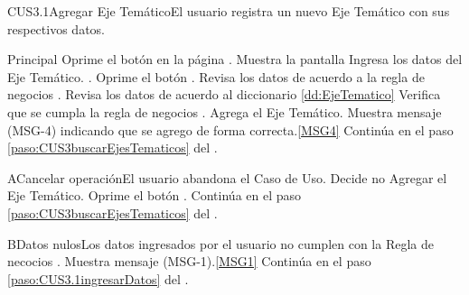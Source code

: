 	\begin{UseCase}{CUS3.1}{Agregar Eje Temático}{El usuario registra un nuevo Eje Temático con sus respectivos datos.}
	\end{UseCase}
	\begin{UCtrayectoria}{Principal}
			\UCpaso[\UCactor] Oprime el botón  en la página .
			\UCpaso Muestra la pantalla  
			\UCpaso [\UCactor] Ingresa los datos del Eje Temático.  \label{paso:CUS3.1ingresarDatos}.
			\UCpaso [\UCactor] Oprime el botón .
			\UCpaso Revisa los datos de acuerdo a la regla de negocios . 
			\UCpaso Revisa los datos de acuerdo al diccionario \ref{dd:EjeTematico} 
			\UCpaso Verifica que se cumpla la regla de negocios .  
			\UCpaso Agrega el Eje Temático.
			\UCpaso Muestra mensaje (MSG-4) indicando que se agrego de forma correcta.\ref{MSG4}
			\UCpaso Continúa en el paso \ref{paso:CUS3buscarEjesTematicos} del .
	\end{UCtrayectoria}
	\newpage
	\begin{UCtrayectoriaA}{A}{Cancelar operación}{El usuario abandona el Caso de Uso.}
			\UCpaso[\UCactor] Decide no Agregar el Eje Temático.
			\UCpaso[\UCactor] Oprime el botón .
			\UCpaso Continúa en el paso \ref{paso:CUS3buscarEjesTematicos} del .
	\end{UCtrayectoriaA}
		
	\begin{UCtrayectoriaA}{B}{Datos nulos}{Los datos ingresados por el usuario  no cumplen con la Regla de necocios .}
			\UCpaso Muestra mensaje (MSG-1).\ref{MSG1}
			\UCpaso Continúa en el paso \ref{paso:CUS3.1ingresarDatos} del .
	\end{UCtrayectoriaA}

